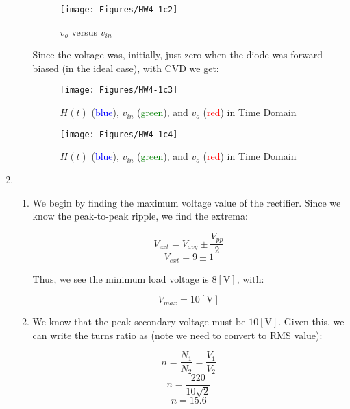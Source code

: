 \begin{enumerate}
\begin{enumerate}
            \begin{figure}[H]
              \centering
              \texttt{[image: Figures/HW4-1c2]}
              \caption{$v_o$ versus $v_{in}$}
              \label{fig:6}
            \end{figure}

            Since the voltage was, initially, just zero when the diode was forward-biased (in the ideal case), with CVD we get:

            \begin{figure}[H]
              \centering
              \texttt{[image: Figures/HW4-1c3]}
              \caption{$H(t)$ (\textcolor{blue}{blue}), $v_{in}$ (\textcolor{green}{green}), and $v_{o}$ (\textcolor{red}{red}) in Time Domain}
              \label{fig:7}
            \end{figure}

            \begin{figure}[H]
              \centering
              \texttt{[image: Figures/HW4-1c4]}
              \caption{$H(t)$ (\textcolor{blue}{blue}), $v_{in}$ (\textcolor{green}{green}), and $v_{o}$ (\textcolor{red}{red}) in Time Domain}
              \label{fig:8}
            \end{figure}

    \end{enumerate}

  \item

    \begin{enumerate}

      \item We begin by finding the maximum voltage value of the rectifier. Since we know the peak-to-peak ripple, we find the extrema:

        $$V_{ext}=V_{avg}\pm\frac{V_{pp}}{2}$$
        $$V_{ext}=9\pm 1$$

        Thus, we see the minimum load voltage is $8[\si{\volt}]$, with:

        $$\boxed{V_{max}=10[\si{\volt}]}$$

      \item 

        We know that the peak secondary voltage must be $10[\si{\volt}]$. Given this, we can write the turns ratio as (note we need to convert to RMS value):

        $$n=\frac{N_1}{N_2}=\frac{V_1}{V_2}$$
        $$n=\frac{220}{10\sqrt{2}}$$
        $$\boxed{n=15.6}$$


\end{enumerate}
\end{enumerate}

